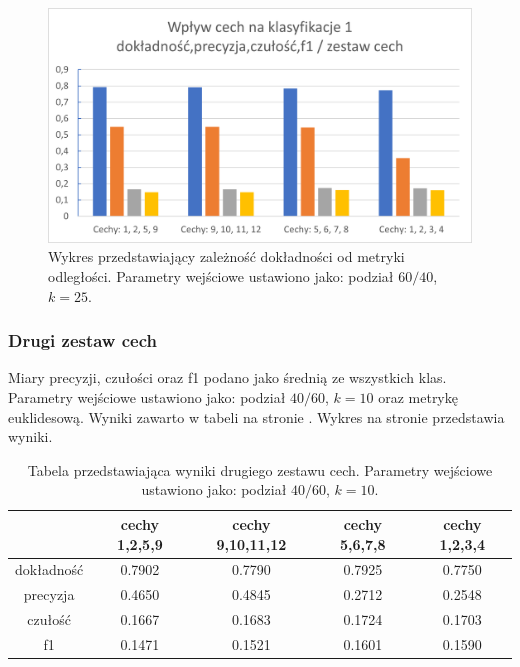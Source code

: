\documentclass{classrep}
\begin{document}
\begin{figure}[H]
\label{features_set_1}
\includegraphics[scale=1]{features_set_1}
\caption{Wykres przedstawiający zależność dokładności od metryki odległości. Parametry wejściowe ustawiono jako: podział $60/40$, $k=25$.}
\end{figure}


\subsubsection{Drugi zestaw cech}
Miary precyzji, czułości oraz f1 podano jako średnią ze wszystkich klas. Parametry wejściowe ustawiono jako: podział $40/60$, $k=10$ oraz metrykę euklidesową. Wyniki zawarto w tabeli na stronie \pageref{tf2}. Wykres na stronie \pageref{features_set_2} przedstawia wyniki.


\begin{table}[H]
\label{tf2}
\begin{tabular}{|c|c|c|c|c|}
\hline  & cechy 1,2,5,9 & cechy 9,10,11,12 & cechy 5,6,7,8 & cechy 1,2,3,4 \\
\hline \hline
dokładność & 0.7902 & 0.7790 & 0.7925 & 0.7750\\
precyzja & 0.4650 & 0.4845 & 0.2712 & 0.2548 \\
czułość & 0.1667 & 0.1683 & 0.1724 & 0.1703\\
f1 & 0.1471 & 0.1521 & 0.1601 & 0.1590 \\
\end{tabular}
\caption{Tabela przedstawiająca wyniki drugiego zestawu cech. Parametry wejściowe ustawiono jako: podział $40/60$, $k=10$.}
\end{table}
\end{document}
